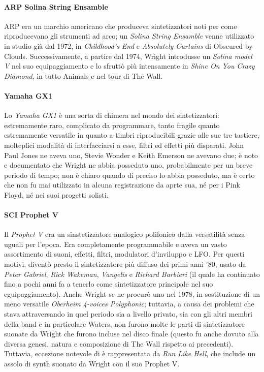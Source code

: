 \documentclass[class=book, crop=false, oneside, 12pt]{standalone}
\begin{document}
    \paragraph{ARP Solina String Ensamble}
    ARP era un marchio americano che produceva sintetizzatori noti per come riproducevano gli strumenti ad arco; un \emph{Solina String Ensamble} venne utilizzato in studio già dal 1972, in \emph{Childhood's End} e \emph{Absolutely Curtains} di Obscured by Clouds. Successivamente, a partire dal 1974, Wright introdusse un \emph{Solina model V} nel suo equipaggiamento e lo sfruttò più intensamente in \emph{Shine On You Crazy Diamond}, in tutto Animals e nel tour di The Wall.

    \paragraph{Yamaha GX1}
    Lo \emph{Yamaha GX1} è una sorta di chimera nel mondo dei sintetizzatori: estremamente raro, complicato da programmare, tanto fragile quanto estremamente versatile in quanto a timbri riproducibili grazie alle sue tre tastiere, molteplici modalità di interfacciarsi a esse, filtri ed effetti più disparati. John Paul Jones ne aveva uno, Stevie Wonder e Keith Emerson ne avevano due; è noto e documentato che Wright ne abbia posseduto uno, probabilmente per un breve periodo di tempo; non è chiaro quando di preciso lo abbia posseduto, ma è certo che non fu mai utilizzato in alcuna registrazione da aprte sua, né per i Pink  Floyd, né nei suoi progetti solisti.

    \paragraph{SCI Prophet V}
    Il \emph{Prophet V} era un sinstetizzatore analogico polifonico dalla versatilità senza uguali per l'epoca. Era completamente programmabile e aveva un vasto assortimento di suoni, effetti, filtri, modulatori d'inviluppo e LFO. Per questi motivi, diventò presto il sintetizzatore più diffuso dei primi anni '80, usato da \emph{Peter Gabriel}, \emph{Rick Wakeman}, \emph{Vangelis} e \emph{Richard Barbieri} (il quale ha continuato fino a pochi anni fa a tenerlo come sintetizzatore principale nel suo eguipaggiamento). Anche Wright se ne procurò uno nel 1978, in sostituzione di un meno versatile \emph{Oberheim 4-voices Polyphonic}; tuttavia, a causa dei problemi che stava attraversando in quel periodo sia a livello privato, sia con gli altri membri della band e in particolare Waters, non furono molte le parti di sintetizzatore suonate da Wright che furono incluse nel disco finale (questo fu anche dovuto alla diversa genesi, natura e composizione di The Wall rispetto ai precedenti). Tuttavia, eccezione notevole di è rappresentata da \emph{Run Like Hell}, che include un assolo di synth suonato da Wright con il suo Prophet V.
\end{document}
